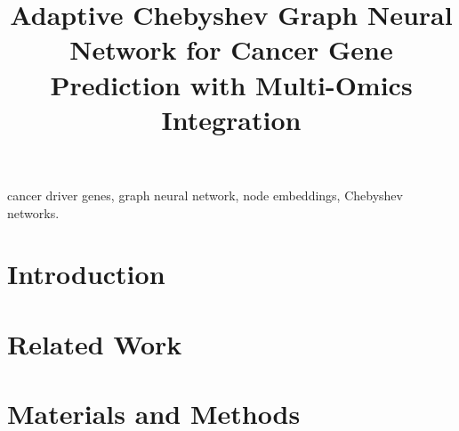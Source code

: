 \documentclass[conference]{IEEEtran}
\begin{document}
	
	\title{Adaptive Chebyshev Graph Neural Network for Cancer Gene Prediction with Multi-Omics Integration}
	\author{
}

	

	\maketitle
	
	\begin{abstract}
		
	\end{abstract}
	
	\begin{IEEEkeywords}
		cancer driver genes, graph neural network, node embeddings, Chebyshev networks.
	\end{IEEEkeywords}
	
	
	\vspace{0.5cm} 
	
	
	\section{Introduction}
	\label{sec:introduction}
	
	
	
%    
	
	\section{Related Work}
	\label{sec:relatedwork}
	
	
	\section{Materials and Methods}
	\label{sec:methods}
	
	
\end{document}
